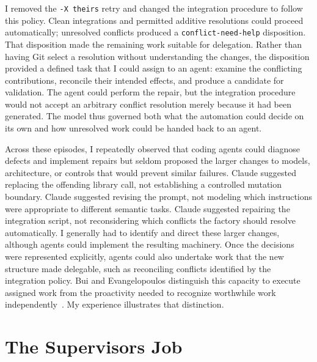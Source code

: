 I removed the \texttt{-X theirs} retry and changed the integration procedure to follow this policy. Clean integrations and permitted additive resolutions could proceed automatically; unresolved conflicts produced a \texttt{conflict-need-help} disposition. That disposition made the remaining work suitable for delegation. Rather than having Git select a resolution without understanding the changes, the disposition provided a defined task that I could assign to an agent: examine the conflicting contributions, reconcile their intended effects, and produce a candidate for validation. The agent could perform the repair, but the integration procedure would not accept an arbitrary conflict resolution merely because it had been generated. The model thus governed both what the automation could decide on its own and how unresolved work could be handed back to an agent.

Across these episodes, I repeatedly observed that coding agents could diagnose defects and implement repairs but seldom proposed the larger changes to models, architecture, or controls that would prevent similar failures. Claude suggested replacing the offending library call, not establishing a controlled mutation boundary. Claude suggested revising the prompt, not modeling which instructions were appropriate to different semantic tasks. Claude suggested repairing the integration script, not reconsidering which conflicts the factory should resolve automatically. I generally had to identify and direct these larger changes, although agents could implement the resulting machinery. Once the decisions were represented explicitly, agents could also undertake work that the new structure made delegable, such as reconciling conflicts identified by the integration policy. Bui and Evangelopoulos distinguish this capacity to execute assigned work from the proactivity needed to recognize worthwhile work independently~\citep{bui2026agentic}. My experience illustrates that distinction.

\section{The Supervisor\textquotesingle s Job}\label{heading:the-supervisors-job}



